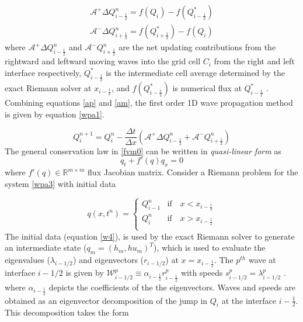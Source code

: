 \documentclass[11pt,a4paper]{article}
\begin{document}
	\begin{eqnarray}
		\mathcal{A^{+}}\Delta Q_{i-\frac{1}{2}}^{n} = f(Q_{i}) - f(Q_{i-\frac{1}{2}}^{*})
		\label{ap}\\
		\mathcal{A^{-}}\Delta Q_{i+\frac{1}{2}}^{n} = f(Q_{i+\frac{1}{2}}^{*}) - f(Q_{i}) 
		\label{am}
	\end{eqnarray}	
	where  $\mathcal{A^{+}}\Delta 	Q_{i-\frac{1}{2}}^{n}$ and  $\mathcal{A^{-}}Q_{i+\frac{1}{2}}^{n}$ are the net updating contributions from the rightward and leftward moving waves into the grid cell $C_{i}$  from the right and left interface respectively,  $Q_{i-\frac{1}{2}}^{*}$ is the intermediate cell average determined by the exact Riemann solver at $x_{i-\frac{1}{2}}$, and $ f(Q_{i-\frac{1}{2}}^{*})$ is numerical flux at $Q_{i-\frac{1}{2}}^{*}$  \cite{ge:2008}. Combining equations \eqref{ap} and \eqref{am}, the  first order 1D  wave propagation method is given by equation \eqref{wpa1}.
	
	\begin{equation}
		Q_{i}^{n+1} =  Q_{i}^{n} - \frac{\Delta t}{\Delta x}(\mathcal{A^{+}}\Delta 	Q_{i-\frac{1}{2}}^{n} + \mathcal{A^{-}}Q_{i+\frac{1}{2}}^{n})
		\label{wpa1}
	\end{equation}
	\label{section:my}
	The general conservation law in \eqref{fvm0} can be written in {\em quasi-linear form}
	as
	\begin{equation}
		q_{t} + f'(q)q_{x} = 0
		\label{wpa3}
	\end{equation}
	where  $f'(q) \in \mathbb{R}^{m\times m}$  flux Jacobian matrix.  Consider a Riemann problem for the system  \eqref{wpa3} with initial data 
	
	\begin{equation}
		q(x,t^n)  = \begin{cases}
			Q_{i-1}^{n}  & \text{if} \quad  x < x_{i-\frac{1}{2}}\\
			Q_{i}^{n} & \text{if} \quad x > x_{i-\frac{1}{2}}\\
		\end{cases}    
		\label{w4}   
	\end{equation}
	The initial data (equation \eqref{w4}), is used by the exact Riemann solver to generate an intermediate state ($q_m = (h_m, hu_m)^T$), which is used to evaluate the eigenvalues ($\lambda_{i-1/2}$) and eigenvectors ($r_{i-1/2}$) at $x = x_{i-\frac{1}{2}}$. The $p^{th}$ wave at interface $i-1/2$ is given by $\mathcal W^p_{i-1/2} \equiv \alpha_{i-\frac{1}{2}} r^p_{i-\frac{1}{2}}$ with speeds $s^p_{i-1/2} = \lambda^p_{i-1/2}$ \cite{leveque2002finite}. where $ \alpha_{i-\frac{1}{2}}$ depicts the coefficients of the the eigenvectors.  Waves and speeds are obtained as an eigenvector decomposition of the jump in $Q_i$ at the interface $i-\frac{1}{2}$.  This decomposition takes the form
	
\end{document}
